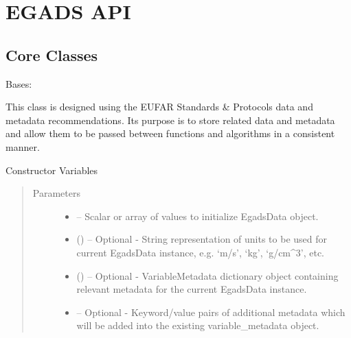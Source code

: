 \documentclass[a4paper,10pt,openany,english]{sphinxmanual}
\begin{document}
\chapter{EGADS API}
\label{egadsapi:egads-api}\label{egadsapi::doc}

\section{Core Classes}
\label{egadsapi:core-classes}\label{egadsapi:module-egads.core.egads_core}

\begin{fulllineitems}
\label{egadsapi:egads.core.egads_core.EgadsData}
Bases: 

This class is designed using the EUFAR Standards \& Protocols data and metadata 
recommendations. Its purpose is to store related data and metadata and allow them to be
passed between functions and algorithms in a consistent manner.

Constructor Variables
\begin{quote}\begin{description}
\item[{Parameters}] \leavevmode\begin{itemize}
\item {} 
 -- Scalar or array of values to initialize EgadsData object.

\item {} 
 () -- Optional - String representation of units to be used for current EgadsData instance, e.g.
`m/s', `kg', `g/cm\textasciicircum{}3', etc.

\item {} 
 ({\hyperref[egadsapi:egads.core.metadata.VariableMetadata]{}}) -- Optional - VariableMetadata dictionary object containing relevant metadata
for the current EgadsData instance.

\item {} 
 -- 
Optional - Keyword/value pairs of additional metadata which will be added into
the existing variable\_metadata object.



\end{itemize}
\end{description}
\end{quote}
\end{fulllineitems}
\end{document}
